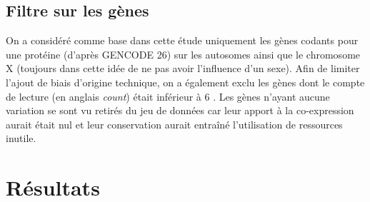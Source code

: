 
\subsection{Filtre sur les gènes}

On a considéré comme base dans cette étude uniquement les gènes codants pour une protéine (d'après GENCODE 26) sur les autosomes ainsi que le chromosome X (toujours dans cette idée de ne pas avoir l'influence d'un sexe). Afin de limiter l'ajout de biais d'origine technique, on a également exclu les gènes dont le compte de lecture (en anglais \textit{count})  était inférieur à 6 \cite{Rocke2001}. Les gènes n'ayant aucune variation se sont vu retirés du jeu de données car leur apport à la co-expression aurait était nul et leur conservation aurait entraîné l'utilisation de ressources inutile.



\section{Résultats}

